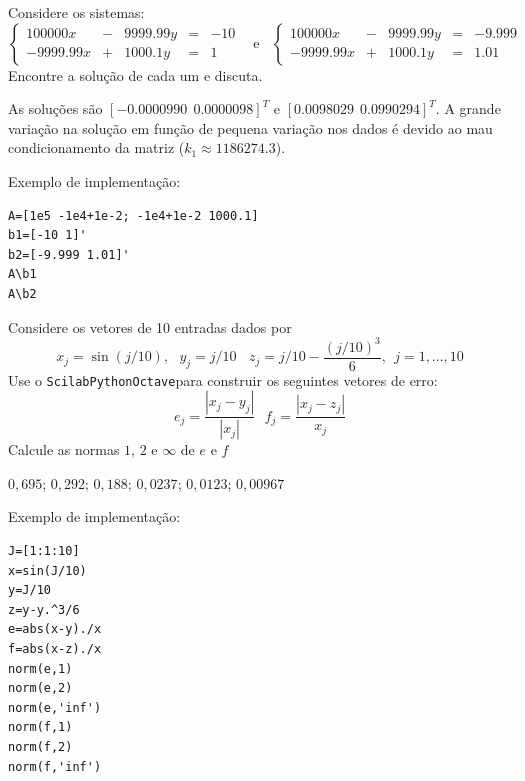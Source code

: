 \begin{exer} Considere os sistemas:
\begin{equation}
\left\{
\begin{array}{rclcl}
100000 x  &-& 9999.99 y  &=&-10\\
-9999.99 x &+&  1000.1 y &=&1
\end{array}\right. ~~~~\text{e}~~~~
\left\{
\begin{array}{rclcl}
100000 x  &-& 9999.99 y  &=&-9.999\\
-9999.99 x &+&  1000.1 y &=&1.01
\end{array}\right.
\end{equation}
Encontre a solução de cada um e discuta.
\end{exer}
\begin{resp}

As soluções são $[-0.0000990 ~~ 0.0000098]^T$ e $[0.0098029 ~~ 0.0990294]^T$. A grande variação na solução em função de pequena variação nos dados é devido ao mau condicionamento da matriz ($k_1\approx 1186274.3 $).

Exemplo de implementação:
\begin{verbatim}
A=[1e5 -1e4+1e-2; -1e4+1e-2 1000.1]
b1=[-10 1]'
b2=[-9.999 1.01]'
A\b1
A\b2
\end{verbatim}

\end{resp}

\begin{exer} Considere os vetores de 10 entradas dados por \begin{equation} x_j=\sin(j/10),~~~y_j=j/10~~~~z_j=j/10-\frac{\left(j/10\right)^3}{6},~~ j=1,\ldots,10 \end{equation}
Use o \ifisscilab\verb+Scilab+\fi\ifispython\verb+Python+\fi\ifisoctave\verb+Octave+\fi para construir os seguintes vetores de erro:
\begin{equation} e_{j}=\frac{|x_j-y_j|}{|x_j|}~~~ f_j=\frac{|x_j-z_j|}{x_j} \end{equation}
Calcule as normas $1$, $2$ e $\infty$ de $e$ e $f$
\end{exer}
\begin{resp}
$0,695$; $0,292$; $0,188$;  $0,0237$; $0,0123$; $0,00967$

\ifisscilab
Exemplo de implementação:
\begin{verbatim}
J=[1:1:10]
x=sin(J/10)
y=J/10
z=y-y.^3/6
e=abs(x-y)./x
f=abs(x-z)./x
norm(e,1)
norm(e,2)
norm(e,'inf')
norm(f,1)
norm(f,2)
norm(f,'inf')
\end{verbatim}
\fi
\end{resp}



